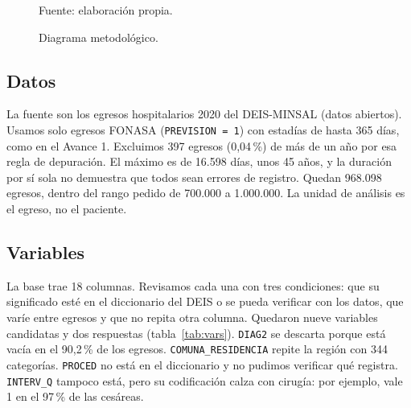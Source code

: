 \documentclass[10.5pt,a4paper,headings=small,abstract=false,bibliography=totoc,listof=totoc]{scrartcl}
\newcommand{\pct}{\,\%}
\begin{document}
\begin{figure}[!htb]
\centering
\caption{Diagrama metodológico.}
\label{fig:diagrama}
{\footnotesize\color{gris}Fuente: elaboración propia.\par}
\end{figure}

\subsection{Datos}

La fuente son los egresos hospitalarios 2020 del DEIS-MINSAL (datos abiertos). Usamos solo egresos FONASA (\texttt{PREVISION = 1}) con estadías de hasta 365 días, como en el Avance 1. Excluimos 397 egresos (0,04\pct{}) de más de un año por esa regla de depuración. El máximo es de 16.598 días, unos 45 años, y la duración por sí sola no demuestra que todos sean errores de registro. Quedan 968.098 egresos, dentro del rango pedido de 700.000 a 1.000.000. La unidad de análisis es el egreso, no el paciente.

\subsection{Variables}

La base trae 18 columnas. Revisamos cada una con tres condiciones: que su significado esté en el diccionario del DEIS o se pueda verificar con los datos, que varíe entre egresos y que no repita otra columna. Quedaron nueve variables candidatas y dos respuestas (tabla~\ref{tab:vars}). \texttt{DIAG2} se descarta porque está vacía en el 90,2\pct{} de los egresos. \texttt{COMUNA\_RESIDENCIA} repite la región con 344 categorías. \texttt{PROCED} no está en el diccionario y no pudimos verificar qué registra. \texttt{INTERV\_Q} tampoco está, pero su codificación calza con cirugía: por ejemplo, vale 1 en el 97\pct{} de las cesáreas.
\end{document}
